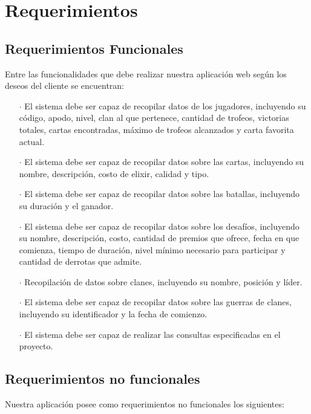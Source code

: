\section{Requerimientos}

\subsection{Requerimientos Funcionales}

Entre las funcionalidades que debe realizar nuestra aplicación web según los deseos del cliente se encuentran:

\begin{enumerate}
  \item[\(\cdot\)] El sistema debe ser capaz de recopilar datos de los jugadores, incluyendo su código, apodo, nivel, clan al que pertenece, cantidad de trofeos, victorias totales, cartas encontradas, máximo de trofeos alcanzados y carta favorita actual.
  \item[\(\cdot\)] El sistema debe ser capaz de recopilar datos sobre las cartas, incluyendo su nombre, descripción, costo de elixir, calidad y tipo.
  \item[\(\cdot\)] El sistema debe ser capaz de recopilar datos sobre las batallas, incluyendo su duración y el ganador.
  \item[\(\cdot\)] El sistema debe ser capaz de recopilar datos sobre los desafíos, incluyendo su nombre, descripción, costo, cantidad de premios que ofrece, fecha en que comienza, tiempo de duración, nivel mínimo necesario para participar y cantidad de derrotas que admite.
  \item[\(\cdot\)] Recopilación de datos sobre clanes, incluyendo su nombre, posición y líder.
  \item[\(\cdot\)] El sistema debe ser capaz de recopilar datos sobre las guerras de clanes, incluyendo su identificador y la fecha de comienzo.
  \item[\(\cdot\)] El sistema debe ser capaz de realizar las consultas especificadas en el proyecto. 
\end{enumerate}

\subsection{Requerimientos no funcionales}

Nuestra aplicación posee como requerimientos no funcionales los siguientes:

